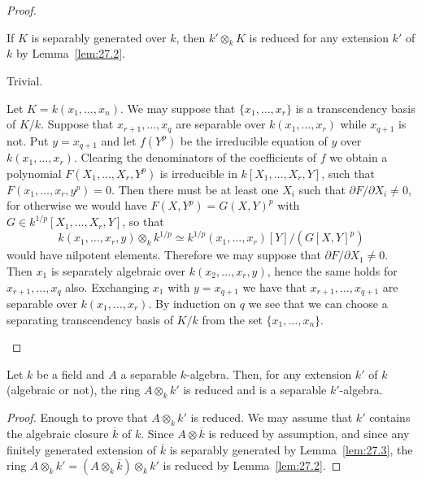 \documentclass[../main]{subfiles}
\begin{document}
\begin{proof}\phantom{,}
\begin{implyenumerate}
    \item[$(3) \implies (1)$] If $K$ is separably generated over $k$, then $k' \otimes_k K$ is reduced for any extension $k'$ of $k$ by Lemma~\ref{lem:27.2}.
    \item[$(1) \implies (2)$] Trivial.
    \item[$(2) \implies (3)$] Let $K = k(x_1, \ldots, x_n)$. We may suppose that $\{x_1, \ldots, x_r\}$ is a transcendency basis of $K/k$. Suppose that $x_{r + 1}, \ldots, x_q$ are separable over $k(x_1, \ldots, x_r)$ while $x_{q + 1}$ is not. Put $y = x_{q + 1}$ and let $f(Y^p)$ be the irreducible equation of $y$ over $k(x_1, \ldots, x_r)$. Clearing the denominators of the coefficients of $f$ we obtain a polynomial $F(X_1, \ldots, X_r, Y^p)$ is irreducible in $k[X_1, \ldots, X_r, Y]$, such that $F(x_1, \ldots, x_r, y^p) = 0$. Then there must be at least one $X_i$ such that $\partial F/\partial X_i \ne 0$, for otherwise we would have $F(X, Y^p) = G(X, Y)^p$ with $G \in k^{1/p}[X_1, \ldots, X_r, Y]$, so that \[k(x_1, \ldots, x_r, y) \otimes_k k^{1/p} \simeq k^{1/p}(x_1, \ldots, x_r)[Y]/(G[X,Y]^p)\] would have nilpotent elements. Therefore we may suppose that \newline $\partial F/\partial X_1 \ne 0$. Then $x_1$ is separately algebraic over $k(x_2, \ldots, x_r, y)$, hence the same holds for $x_{r + 1}, \ldots, x_q$ also. Exchanging $x_1$ with $y = x_{q + 1}$ we have that $x_{r + 1}, \ldots, x_{q + 1}$ are separable over $k(x_1, \ldots, x_r)$. By induction on $q$ we see that we can choose a separating transcendency basis of $K/k$ from the set $\{x_1, \ldots, x_n\}$. 
\end{implyenumerate}
\end{proof}

\begin{parproposition}
Let $k$ be a field and $A$ a separable $k$-algebra. Then, for any extension $k'$ of $k$ (algebraic or not), the ring $A \otimes_k k'$ is reduced and is a separable $k'$-algebra. 
\end{parproposition}

\begin{proof}
Enough to prove that $A \otimes_k k'$ is reduced. We may assume that $k'$ contains the algebraic closure $\overline k$ of $k$. Since $A \otimes \overline k$ is reduced by assumption, and since any finitely generated extension of $\overline k$ is separably generated by Lemma~\ref{lem:27.3}, the ring $A \otimes_k k' = (A \otimes_k \overline k) \otimes_{\overline k} k'$ is reduced by Lemma~\ref{lem:27.2}.
\end{proof}
\end{document}
